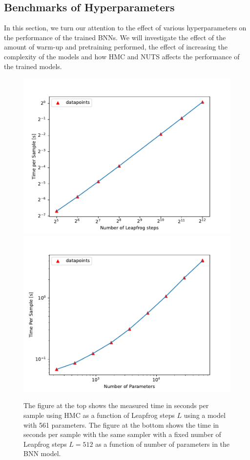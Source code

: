 \subsection{Benchmarks of Hyperparameters}\label{subsec:benchmarks}
In this section, we turn our attention to the effect of various hyperparameters on the performance of the trained BNNs. 
We will investigate the effect of the amount of warm-up and pretraining performed, the effect of increasing the complexity of the models and how HMC and NUTS affects the performance of the trained models. 

\begin{figure}[h!]
    \centering
    \includegraphics[scale=0.7]{figures/computational_cost/time_vs_leapfrogsteps_hmc.pdf}
    \includegraphics[scale=0.7]{figures/computational_cost/time_vs_params.pdf}
    \caption{The figure at the top shows the measured time in seconds per sample using HMC as a function of Leapfrog steps $L$ using a model with
    561 parameters. The figure at the bottom shows the time in seconds per sample with the same sampler with a fixed number of Leapfrog steps $L = 512$ as a function of number of parameters in the BNN model.
    }
    \label{fig:time_vs_leapfrogsteps}
\end{figure}

